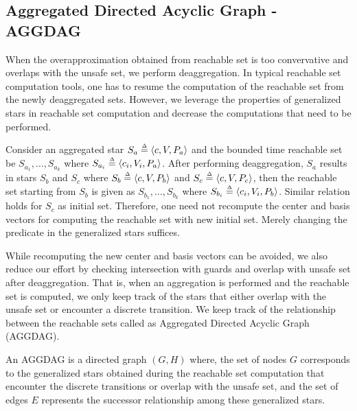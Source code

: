 \subsection{Aggregated Directed Acyclic Graph - AGGDAG}
\label{sec:aggdag}

When the overapproximation obtained from reachable set is too convervative and overlaps with the unsafe set, we perform deaggregation. In typical reachable set computation tools, one has to resume the computation of the reachable set from the newly deaggregated sets. However, we leverage the properties of generalized stars in reachable set computation and decrease the computations that need to be performed.

\begin{remark}
\label{rem:changePred}
Consider an aggregated star $S_a \deq \tup{c, V, P_a}$ and the bounded time reachable set be $S_{a_1}, \ldots, S_{a_k}$ where $S_{a_i} \deq \tup{c_i, V_i, P_a}$. After performing deaggregation, $S_a$ results in stars $S_{b}$ and $S_c$ where $S_{b} \deq \tup{c, V, P_{b}}$ and $S_{c} \deq \tup{c, V, P_{c}}$, then the reachable set starting from $S_{b}$ is given as $S_{b_1}, \ldots, S_{b_k}$ where $S_{b_i} \deq \tup{c_i, V_i, P_b}$. Similar relation holds for $S_{c}$ as initial set. Therefore, one need not recompute the center and basis vectors for computing the reachable set with new initial set. Merely changing the predicate in the generalized stars suffices.
\end{remark}

While recomputing the new center and basis vectors can be avoided, we also reduce our effort by checking intersection with guards and overlap with unsafe set after deaggregation. That is, when an aggregation is performed and the reachable set is computed, we only keep track of the stars that either overlap with the unsafe set or encounter a discrete transition. We keep track of the relationship between the reachable sets called as Aggregated Directed Acyclic Graph (AGGDAG).

\begin{definition}
\label{def:aggdag}
An AGGDAG is a directed graph $(G, H)$ where, the set of nodes $G$ corresponds to the generalized stars obtained during the reachable set computation that encounter the discrete transitions or overlap with the unsafe set, and the set of edges $E$ represents the successor relationship among these generalized stars.
\end{definition}

